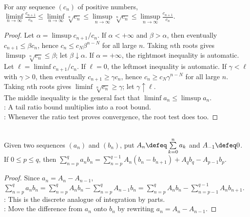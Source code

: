 \begin{theorem} \label{thm:root-test-dominates-ratio-test} \\
For any sequence $(c_n)$ of positive numbers, $\liminf\limits_{n\to\infty}\frac{c_{n+1}}{c_n}\leq \liminf\limits_{n\to\infty}\sqrt[n]{c_n} \leq \limsup\limits_{n\to\infty}\sqrt[n]{c_n}\leq \limsup\limits_{n\to\infty}\frac{c_{n+1}}{c_n}$.
\begin{proof}
Let $\alpha=\limsup c_{n+1}/c_n$. If $\alpha<+\infty$ and $\beta>\alpha$, then eventually $c_{n+1}\leq\beta c_n$, hence $c_n\leq c_N\beta^{n-N}$ for all large $n$. Taking $n$th roots gives $\limsup\sqrt[n]{c_n}\leq\beta$; let $\beta\downarrow\alpha$. If $\alpha=+\infty$, the rightmost inequality is automatic.\\
Let $\ell=\liminf c_{n+1}/c_n$. If $\ell=0$, the leftmost inequality is automatic. If $\gamma<\ell$ with $\gamma>0$, then eventually $c_{n+1}\geq\gamma c_n$, hence $c_n\geq c_N\gamma^{n-N}$ for all large $n$. Taking $n$th roots gives $\liminf\sqrt[n]{c_n}\geq\gamma$; let $\gamma\uparrow\ell$.\\
The middle inequality is the general fact that $\liminf a_n\leq\limsup a_n$.\\
: A tail ratio bound multiplies into a root bound.\\
: Whenever the ratio test proves convergence, the root test does too.
\end{proof}
\end{theorem}

\begin{theorem} \label{thm:summation-by-parts} \\
Given two sequences $(a_n)$ and $(b_n)$, put $A_n\defeq\sum\limits_{k=0}^{n}a_k$ and $A_{-1}\defeq0$.\\
If $0\leq p\leq q$, then $\sum\limits_{n=p}^{q}a_nb_n=\sum\limits_{n=p}^{q-1}A_n(b_n-b_{n+1})+A_qb_q-A_{p-1}b_p$.
\begin{proof}
Since $a_n=A_n-A_{n-1}$, $\sum\limits_{n=p}^{q}a_nb_n=\sum\limits_{n=p}^{q}A_nb_n-\sum\limits_{n=p}^{q}A_{n-1}b_n =\sum\limits_{n=p}^{q}A_nb_n-\sum\limits_{n=p-1}^{q-1}A_nb_{n+1}$.\\
: This is the discrete analogue of integration by parts.\\
: Move the difference from $a_n$ onto $b_n$ by rewriting $a_n=A_n-A_{n-1}$.
\end{proof}
\end{theorem}

